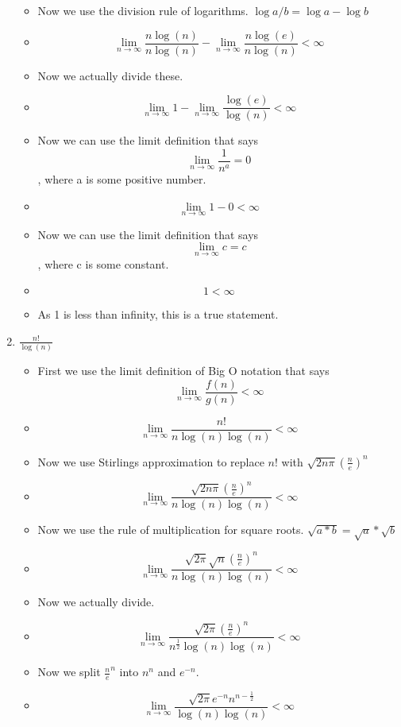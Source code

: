 \documentclass{article}
\begin{document}
\begin{enumerate}
\begin{itemize}
  \item Now we use the division rule of logarithms. $\log{a/b} = \log{a} - \log{b}$
  \item {\Large $$\lim_{n \to \infty} \frac{n\log{(n)}}{n\log{(n)}} - \lim_{n \to \infty} \frac{n\log{(e)}}{n\log{(n)}} <\infty$$}
  \item Now we actually divide these.
  \item {\Large $$\lim_{n \to \infty} 1 - \lim_{n \to \infty} \frac{\log{(e)}}{\log{(n)}} <\infty$$}
  \item Now we can use the limit definition that says $$\lim_{n \to \infty} \frac{1}{n^{a}} = 0$$, where a is some positive number.
  \item {\Large $$\lim_{n \to \infty} 1 - 0 <\infty$$}
  \item Now we can use the limit definition that says $$\lim_{n \to \infty} c =c$$, where c is some constant.
  \item $$1 <\infty$$
  \item As 1 is less than infinity, this is a true statement.
  \end{itemize}
\item {\large $\frac{n!}{\log{(n)}}$}
  \begin{itemize}
  \item First we use the limit definition of Big O notation that says $$\lim_{n \to \infty} \frac{f(n)}{g(n)} < \infty$$
  \item {\large $$\lim_{n \to \infty} \frac{n!}{n\log{(n)}\log{(n)}} < \infty$$}
  \item Now we use Stirlings approximation to replace $n!$ with $\sqrt{2n\pi}(\frac{n}{e})^{n}$
  \item {\large $$\lim_{n \to \infty} \frac{\sqrt{2n\pi}(\frac{n}{e})^{n}}{n\log{(n)}\log{(n)}} < \infty$$}
  \item Now we use the rule of multiplication for square roots. $\sqrt{a*b} = \sqrt{a}*\sqrt{b}$
  \item {\large $$\lim_{n \to \infty} \frac{\sqrt{2\pi}\sqrt{n}(\frac{n}{e})^{n}}{n\log{(n)}\log{(n)}} < \infty$$}
  \item Now we actually divide.
  \item {\large $$\lim_{n \to \infty} \frac{\sqrt{2\pi}(\frac{n}{e})^{n}}{n^{\frac{1}{2}}\log{(n)}\log{(n)}} < \infty$$}
  \item Now we split $\frac{n}{e}^{n}$ into $n^{n}$ and $e^{-n}$.
  \item {\large $$\lim_{n \to \infty} \frac{\sqrt{2\pi}e^{-n}n^{n-\frac{1}{2}}}{\log{(n)}\log{(n)}} < \infty$$}

\end{itemize}
\end{enumerate}
\end{document}
